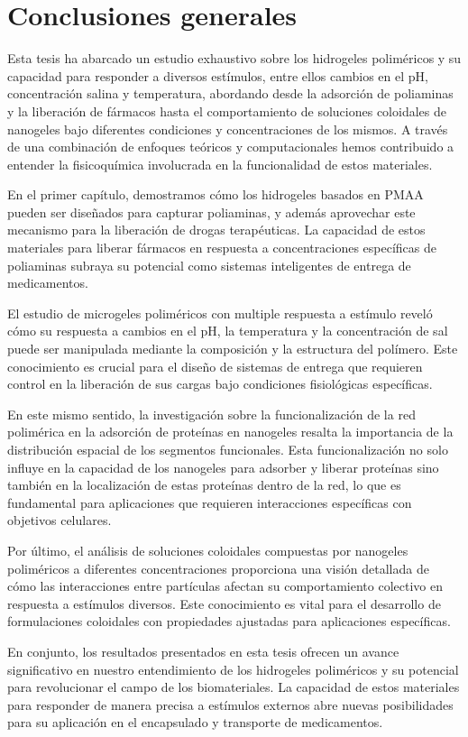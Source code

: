 \chapter{Conclusiones generales}

Esta tesis ha abarcado un estudio exhaustivo sobre los hidrogeles polim\'ericos y su capacidad para responder a diversos est\'imulos, entre ellos cambios en el pH, concentraci\'on salina y temperatura, abordando desde la adsorci\'on de poliaminas y la liberaci\'on de f\'armacos hasta el comportamiento de soluciones coloidales de nanogeles bajo diferentes condiciones y concentraciones de los mismos. A trav\'es de una combinaci\'on de enfoques te\'oricos y computacionales hemos contribuido a entender la fisicoqu\'imica involucrada en la funcionalidad de estos materiales.

En el primer cap\'itulo, demostramos c\'omo los hidrogeles basados en PMAA pueden ser dise\~nados para capturar poliaminas, y adem\'as aprovechar este mecanismo para la liberaci\'on de drogas terap\'euticas. La capacidad de estos materiales para liberar f\'armacos en respuesta a concentraciones espec\'ificas de poliaminas subraya su potencial como sistemas inteligentes de entrega de medicamentos.

El estudio de microgeles polim\'ericos con multiple respuesta a est\'imulo revel\'o c\'omo su respuesta a cambios en el pH, la temperatura y la concentraci\'on de sal puede ser manipulada mediante la composici\'on y la estructura del pol\'imero. Este conocimiento es crucial para el dise\~no de sistemas de entrega que requieren control en la liberaci\'on de sus cargas bajo condiciones fisiol\'ogicas espec\'ificas.

En este mismo sentido, la investigaci\'on sobre la funcionalizaci\'on de la red polim\'erica en la adsorci\'on de prote\'inas en nanogeles resalta la importancia de la distribuci\'on espacial de los segmentos funcionales. Esta funcionalizaci\'on no solo influye en la capacidad de los nanogeles para adsorber y liberar prote\'inas sino tambi\'en en la localizaci\'on de estas prote\'inas dentro de la red, lo que es fundamental para aplicaciones que requieren interacciones espec\'ificas con objetivos celulares.

Por \'ultimo, el an\'alisis de soluciones coloidales compuestas por nanogeles polim\'ericos a diferentes concentraciones proporciona una visi\'on detallada de c\'omo las interacciones entre part\'iculas afectan su comportamiento colectivo en respuesta a est\'imulos diversos. Este conocimiento es vital para el desarrollo de formulaciones coloidales con propiedades ajustadas para aplicaciones espec\'ificas.

En conjunto, los resultados presentados en esta tesis ofrecen un avance significativo en nuestro entendimiento de los hidrogeles polim\'ericos y su potencial para revolucionar el campo de los biomateriales. La capacidad de estos materiales para responder de manera precisa a est\'imulos externos abre nuevas posibilidades para su aplicaci\'on en el encapsulado y transporte de medicamentos.